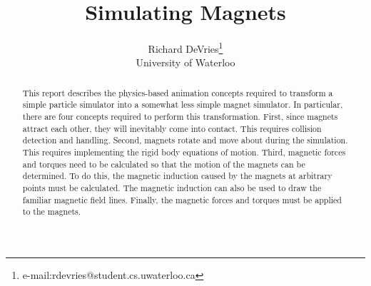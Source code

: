 \documentclass[tog]{acmsiggraph}
\title{Simulating Magnets}
\author{Richard DeVries\thanks{e-mail:rdevries@student.cs.uwaterloo.ca}\\University of Waterloo}
\begin{document}



\maketitle


\begin{abstract}

This report describes the physics-based animation concepts required to transform a simple particle simulator into a somewhat less simple magnet simulator. In particular, there are four concepts required to perform this transformation. First, since magnets attract each other, they will inevitably come into contact. This requires collision detection and handling. Second, magnets rotate and move about during the simulation. This requires implementing the rigid body equations of motion. Third, magnetic forces and torques need to be calculated so that the motion of the magnets can be determined. To do this, the magnetic induction caused by the magnets at arbitrary points must be calculated. The magnetic induction can also be used to draw the familiar magnetic field lines. Finally, the magnetic forces and torques must be applied to the magnets.


\end{abstract}
\end{document}
